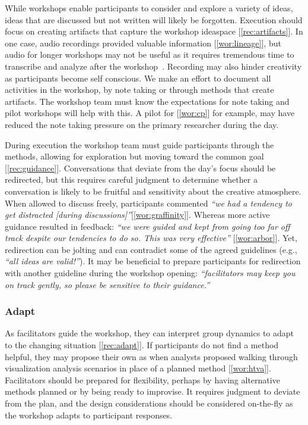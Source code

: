 While workshops enable participants to consider and explore a variety of ideas, ideas that are discussed but not written will likely be forgotten. Execution should focus on creating artifacts that capture the workshop ideaspace [\ref{rec:artifacts}]. In one case, audio recordings provided valuable information [\ref{wor:lineage}], but audio for longer workshops may not be useful as it requires tremendous time to transcribe and analyze after the workshop~\cite{Lloyd2011}. Recording may also hinder creativity as participants become self conscious. We make an effort to document all activities in the workshop, by note taking or through methods that create artifacts. The workshop team must know the expectations for note taking and pilot workshops will help with this. A pilot for [\ref{wor:cp}] for example, may have reduced the note taking pressure on the primary researcher during the day.

During execution the workshop team must guide participants through the methods, allowing for exploration but moving toward the common goal [\ref{rec:guidance}]. Conversations that deviate from the day's focus should be redirected, but this requires careful judgment to determine whether a conversation is likely to be fruitful and sensitivity about the creative atmosphere. When allowed to discuss freely, participants commented \emph{``we had a tendency to get distracted [during discussions]''}[\ref{wor:graffinity}]. Whereas more active guidance resulted in feedback: \emph{``we were guided and kept from going too far off track despite our tendencies to do so. This was very effective''} [\ref{wor:arbor}]. Yet, redirection can be jolting and can contradict some of the agreed guidelines (e.g., \emph{``all ideas are valid!''}). It may be beneficial to prepare participants for redirection with another guideline during the workshop opening: \emph{``facilitators may keep you on track gently, so please be sensitive to their guidance.''}

\subsubsection{Adapt}

As facilitators guide the workshop, they can interpret group dynamics to adapt to the changing situation [\ref{rec:adapt}]. If participants do not find a method helpful, they may propose their own as when analysts proposed walking through visualization analysis scenarios in place of a planned method [\ref{wor:htva}]. Facilitators should be prepared for flexibility, perhaps by having alternative methods planned or by being ready to improvise. It requires judgment to deviate from the plan, and the design considerations should be considered on-the-fly as the workshop adapts to participant responses.

